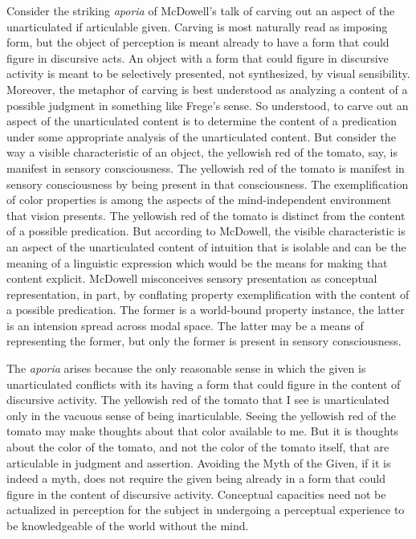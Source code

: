 \documentclass[12pt]{article}
\begin{document}
Consider the striking \emph{aporia} of McDowell's talk of carving out an aspect of the unarticulated if articulable given. Carving is most naturally read as imposing form, but the object of perception is meant already to have a form that could figure in discursive acts. An object with a form that could figure in discursive activity is meant to be selectively presented, not synthesized, by visual sensibility. Moreover, the metaphor of carving is best understood as analyzing a content of a possible judgment in something like Frege's sense. So understood, to carve out an aspect of the unarticulated content is to determine the content of a predication under some appropriate analysis of the unarticulated content. But consider the way a visible characteristic of an object, the yellowish red of the tomato, say, is manifest in sensory consciousness. The yellowish red of the tomato is manifest in sensory consciousness by being present in that consciousness. The exemplification of color properties is among the aspects of the mind-independent environment that vision presents. The yellowish red of the tomato is distinct from the content of a possible predication. But according to McDowell, the visible characteristic is an aspect of the unarticulated content of intuition that is isolable and can be the meaning of a linguistic expression which would be the means for making that content explicit. McDowell misconceives sensory presentation as conceptual representation, in part, by conflating property exemplification with the content of a possible predication. The former is a world-bound property instance, the latter is an intension spread across modal space. The latter may be a means of representing the former, but only the former is present in sensory consciousness.

The \emph{aporia} arises because the only reasonable sense in which the given is unarticulated conflicts with its having a form that could figure in the content of discursive activity. The yellowish red of the tomato that I see is unarticulated only in the vacuous sense of being inarticulable. Seeing the yellowish red of the tomato may make thoughts about that color available to me. But it is thoughts about the color of the tomato, and not the color of the tomato itself, that are articulable in judgment and assertion. Avoiding the Myth of the Given, if it is indeed a myth, does not require the given being already in a form that could figure in the content of discursive activity. Conceptual capacities need not be actualized in perception for the subject in undergoing a perceptual experience to be knowledgeable of the world without the mind.

\end{document}
